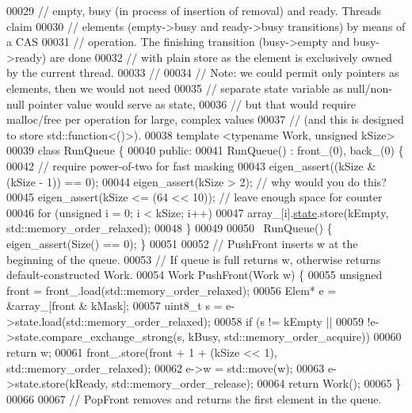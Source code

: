 \begin{DoxyCode}
00029 \textcolor{comment}{// empty, busy (in process of insertion of removal) and ready. Threads claim}
00030 \textcolor{comment}{// elements (empty->busy and ready->busy transitions) by means of a CAS}
00031 \textcolor{comment}{// operation. The finishing transition (busy->empty and busy->ready) are done}
00032 \textcolor{comment}{// with plain store as the element is exclusively owned by the current thread.}
00033 \textcolor{comment}{//}
00034 \textcolor{comment}{// Note: we could permit only pointers as elements, then we would not need}
00035 \textcolor{comment}{// separate state variable as null/non-null pointer value would serve as state,}
00036 \textcolor{comment}{// but that would require malloc/free per operation for large, complex values}
00037 \textcolor{comment}{// (and this is designed to store std::function<()>).}
00038 \textcolor{keyword}{template} <\textcolor{keyword}{typename} Work, \textcolor{keywordtype}{unsigned} kSize>
00039 \textcolor{keyword}{class }RunQueue \{
00040  \textcolor{keyword}{public}:
00041   RunQueue() : front\_(0), back\_(0) \{
00042     \textcolor{comment}{// require power-of-two for fast masking}
00043     eigen\_assert((kSize & (kSize - 1)) == 0);
00044     eigen\_assert(kSize > 2);            \textcolor{comment}{// why would you do this?}
00045     eigen\_assert(kSize <= (64 << 10));  \textcolor{comment}{// leave enough space for counter}
00046     \textcolor{keywordflow}{for} (\textcolor{keywordtype}{unsigned} i = 0; i < kSize; i++)
00047       array\_[i].\hyperlink{structstate}{state}.store(kEmpty, std::memory\_order\_relaxed);
00048   \}
00049 
00050   ~RunQueue() \{ eigen\_assert(Size() == 0); \}
00051 
00052   \textcolor{comment}{// PushFront inserts w at the beginning of the queue.}
00053   \textcolor{comment}{// If queue is full returns w, otherwise returns default-constructed Work.}
00054   Work PushFront(Work w) \{
00055     \textcolor{keywordtype}{unsigned} front = front\_.load(std::memory\_order\_relaxed);
00056     Elem* e = &array\_[front & kMask];
00057     uint8\_t s = e->state.load(std::memory\_order\_relaxed);
00058     \textcolor{keywordflow}{if} (s != kEmpty ||
00059         !e->state.compare\_exchange\_strong(s, kBusy, std::memory\_order\_acquire))
00060       \textcolor{keywordflow}{return} w;
00061     front\_.store(front + 1 + (kSize << 1), std::memory\_order\_relaxed);
00062     e->w = std::move(w);
00063     e->state.store(kReady, std::memory\_order\_release);
00064     \textcolor{keywordflow}{return} Work();
00065   \}
00066 
00067   \textcolor{comment}{// PopFront removes and returns the first element in the queue.}

\end{DoxyCode}
